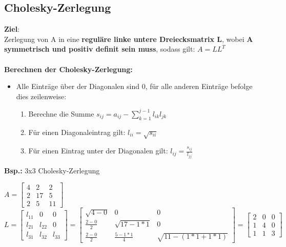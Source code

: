 \documentclass[10pt,a4paper]{article}
\begin{document}
	\subsection{Cholesky-Zerlegung}
	\textbf{Ziel}:\\Zerlegung von A in eine \textbf{reguläre linke untere Dreiecksmatrix L}, wobei \textbf{A symmetrisch und positiv definit sein muss}, sodass gilt: $A = LL^T$\\\\
	\textbf{Berechnen der Cholesky-Zerlegung:}
	\begin{itemize}
		\item Alle Einträge über der Diagonalen sind 0, für alle anderen Einträge befolge dies zeilenweise:
		\begin{enumerate}
			\item Berechne die Summe $s_{ij} = a_{ij} - \sum_{k = 1}^{j - 1} l_{ik}l_{jk}$
			\item Für einen Diagonaleintrag gilt: $l_{ii} = \sqrt{s_{ii}}$ 
			\item Für einen Eintrag unter der Diagonalen gilt: $l_{ij} = \frac{s_{ij}}{l_{jj}}$
		\end{enumerate}
	\end{itemize}
	\textbf{Bsp.:} 3x3 Cholesky-Zerlegung
	\begin{center}
		$A 	= \begin{bmatrix}
				4 & 2 & 2\\
				2 & 17 & 5\\
				2 & 5 & 11
			\end{bmatrix}$\\
			\vspace*{0.5cm}
		$L 	= \begin{bmatrix}
				l_{11} & 0 & 0\\
				l_{21} & l_{22} & 0\\
				l_{31} & l_{32} & l_{33}
			\end{bmatrix}
			= \begin{bmatrix}
		  		\sqrt{4 - 0} & 0 & 0\\
		  		\frac{2 - 0}{2} & \sqrt{17 - 1 * 1} & 0\\
		  		\frac{2 - 0}{2} & \frac{5 - 1 * 1}{4} & \sqrt{11 - (1 * 1 + 1 * 1)}
 			\end{bmatrix}
 			= \begin{bmatrix}
	 			2 & 0 & 0\\
	 			1 & 4 & 0\\
	 			1 & 1 & 3
 			\end{bmatrix}$
	\end{center}
\end{document}
